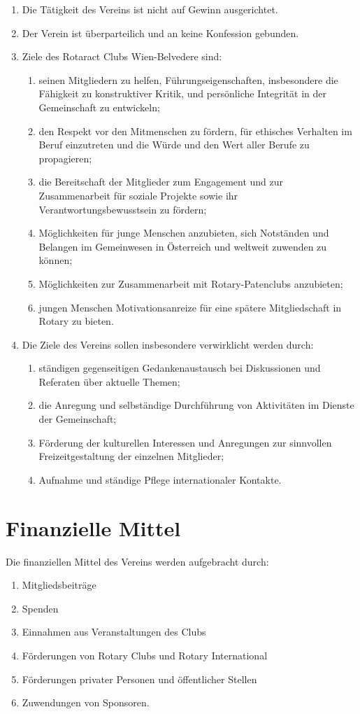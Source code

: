 \documentclass{statutclass}
\begin{document}
\begin{enumerate}
    \item Die Tätigkeit des Vereins ist nicht auf Gewinn ausgerichtet.
    \item Der Verein ist überparteilich und an keine Konfession gebunden.
    \item Ziele des Rotaract Clubs Wien-Belvedere sind:
    \begin{enumerate}
        \item seinen Mitgliedern zu helfen, Führungseigenschaften, insbesondere die Fähigkeit zu konstruktiver Kritik, und persönliche Integrität in der Gemeinschaft zu entwickeln;
        \item den Respekt vor den Mitmenschen zu fördern, für ethisches Verhalten im Beruf einzutreten und die Würde und den Wert aller Berufe zu propagieren;
        \item die Bereitschaft der Mitglieder zum Engagement und zur Zusammenarbeit für soziale Projekte sowie ihr Verantwortungsbewusstsein zu fördern;
        \item Möglichkeiten für junge Menschen anzubieten, sich Notständen und Belangen im Gemeinwesen in Österreich und weltweit zuwenden zu können;
        \item Möglichkeiten zur Zusammenarbeit mit Rotary-Patenclubs anzubieten;
        \item jungen Menschen Motivationsanreize für eine spätere Mitgliedschaft in Rotary zu bieten.
    \end{enumerate}
    \item Die Ziele des Vereins sollen insbesondere verwirklicht werden durch:
    \begin{enumerate}
        \item ständigen gegenseitigen Gedankenaustausch bei Diskussionen und Referaten über aktuelle Themen;
        \item die Anregung und selbständige Durchführung von Aktivitäten im Dienste der Gemeinschaft;
        \item Förderung der kulturellen Interessen und Anregungen zur sinnvollen Freizeitgestaltung der einzelnen Mitglieder;
    \item Aufnahme und ständige Pflege internationaler Kontakte.
    \end{enumerate}
\end{enumerate}

\section{Finanzielle Mittel}
Die finanziellen Mittel des Vereins werden aufgebracht durch:
\begin{enumerate}[label=\alph*)]
    \item Mitgliedsbeiträge
    \item Spenden
    \item Einnahmen aus Veranstaltungen des Clubs
    \item Förderungen von Rotary Clubs und Rotary International
    \item Förderungen privater Personen und öffentlicher Stellen
    \item Zuwendungen von Sponsoren.
\end{enumerate}
\end{document}
